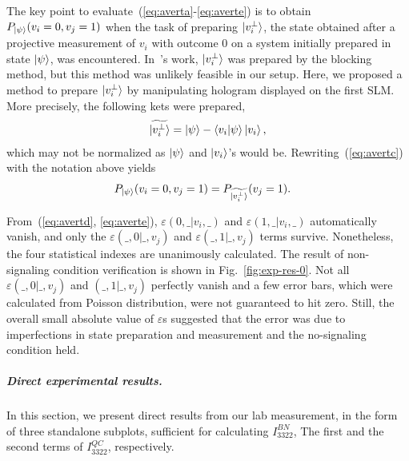 \documentclass[pra,aps,notitlepage,superscriptaddress,showpacs,showkeys]{revtex4-1}
\theoremstyle{definition}
\theoremstyle{remark}
\begin{document}
 The key point to evaluate~(\ref{eq:averta}-\ref{eq:averte}) is to obtain $P_{\ket{\psi}} (v_i = 0, v_j = 1)$ when the task of preparing $\ket{v_i^\perp}$, the state obtained after a projective measurement of $v_i$ with outcome 0 on a system initially prepared in state $\ket{\psi}$, was encountered. In~\cite{yxiao17s}'s work, $\ket{v_i^\perp}$ was prepared by the blocking method, but this method was unlikely feasible in our setup.
 Here, we proposed a method to prepare $\ket{v_i^\perp}$ by manipulating hologram displayed on the first SLM. More precisely, the following kets were prepared,
    \begin{align}
        \widetilde{\ket{v_i^\perp}} = \ket{\psi} - \braket{v_i|\psi}\ket{v_i},
    \end{align}
 which may not be normalized as $\ket{\psi}$ and $\ket{v_i}$'s would be. Rewriting~(\ref{eq:avertc}) with the notation above yields
    \begin{align}
        P_{\ket{\psi}} (v_i = 0, v_j = 1) &= P_{\widetilde{\ket{v_i^\perp}}} (v_j = 1).
    \end{align}


 From~(\ref{eq:avertd}, \ref{eq:averte}), $\varepsilon(0, \_|v_i, \_)$ and $\varepsilon(1, \_|v_i, \_)$ automatically vanish, and only the $\varepsilon(\_, 0|\_, v_j)$ and $\varepsilon(\_, 1|\_, v_j)$ terms survive. Nonetheless, the four statistical indexes are unanimously calculated.
 The result of non-signaling condition verification is shown in Fig.~\ref{fig:exp-res-0}. Not all $\varepsilon(\_, 0|\_, v_j)$ and $(\_, 1|\_, v_j)$ perfectly vanish and a few error bars, which were calculated from Poisson distribution, were not guaranteed to hit zero.
 Still, the overall small absolute value of $\varepsilon$s suggested that the error was due to imperfections in state preparation and measurement and the no-signaling condition held.
 
  \subparagraph{Direct experimental results.} In this section, we present direct results from our lab measurement, in the form of three standalone subplots, sufficient for calculating $I_{3322}^{BN}$, The first and the second terms of $I_{3322}^{QC}$, respectively. 
 
\end{document}
